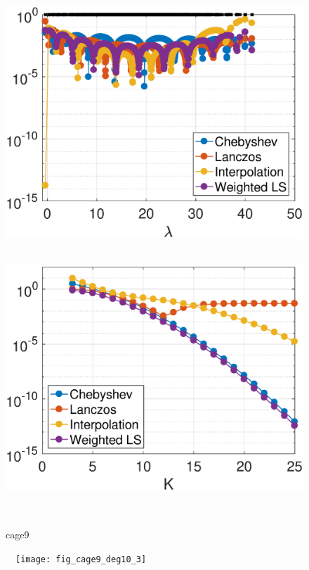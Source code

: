 \documentclass{article}
\begin{document}
\begin{figure}[bth]
\begin{minipage}[m]{0.44\linewidth}
\centerline{~~\includegraphics[width=.95\linewidth]{fig_si2_deg10}}
\end{minipage}
\begin{minipage}[m]{0.44\linewidth}
\centerline{~~\includegraphics[width=.95\linewidth]{fig_si2_err_const_b}}
\end{minipage}\\
\begin{minipage}[m]{0.1\linewidth}
\centerline{\small{cage9}}
\end{minipage}
\begin{minipage}[m]{0.44\linewidth}
\centerline{~~\texttt{[image: fig\_cage9\_deg10\_3]}}
\end{minipage}
\begin{minipage}[m]{0.44\linewidth}

\end{minipage}
\end{figure}
\end{document}
